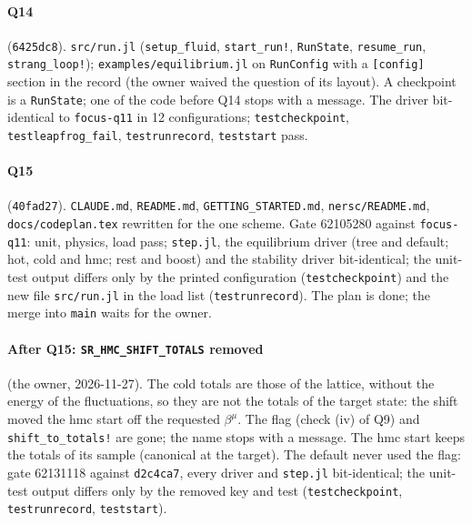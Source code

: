 \documentclass[11pt,aps,preprint,nofootinbib,superscriptaddress,tightenlines]{revtex4-2}
\let\oldparagraph\paragraph
\renewcommand{\paragraph}{\par\bigskip\oldparagraph}
\begin{document}
\paragraph{Q14} (\texttt{6425dc8}).  \nolinkurl{src/run.jl} (\texttt{setup\_fluid}, \texttt{start\_run!}, \texttt{RunState},
\texttt{resume\_run}, \texttt{strang\_loop!}); \nolinkurl{examples/equilibrium.jl} on \texttt{RunConfig} with a \texttt{[config]}
section in the record (the owner waived the question of its layout).  A checkpoint is a \texttt{RunState}; one of the code before Q14
stops with a message.  The driver bit-identical to \texttt{focus-q11} in 12 configurations; \texttt{testcheckpoint},
\texttt{testleapfrog\_fail}, \texttt{testrunrecord}, \texttt{teststart} pass.

\paragraph{Q15} (\texttt{40fad27}).  \nolinkurl{CLAUDE.md}, \nolinkurl{README.md}, \nolinkurl{GETTING_STARTED.md},
\nolinkurl{nersc/README.md}, \nolinkurl{docs/codeplan.tex} rewritten for the one scheme.  Gate 62105280 against \texttt{focus-q11}:
unit, physics, load pass; \texttt{step.jl}, the equilibrium driver (tree and default; hot, cold and hmc; rest and boost) and the
stability driver bit-identical; the unit-test output differs only by the printed configuration (\texttt{testcheckpoint}) and the
new file \nolinkurl{src/run.jl} in the load list (\texttt{testrunrecord}).  The plan is done; the merge into \texttt{main} waits for
the owner.

\paragraph{After Q15: \texttt{SR\_HMC\_SHIFT\_TOTALS} removed} (the owner, 2026-11-27).  The cold totals are those of the lattice, without
the energy of the fluctuations, so they are not the totals of the target state: the shift moved the hmc start off the requested
$\beta^\mu$.  The flag (check (iv) of Q9) and \texttt{shift\_to\_totals!} are gone; the name stops with a message.  The hmc start keeps
the totals of its sample (canonical at the target).  The default never used the flag: gate 62131118 against \texttt{d2c4ca7}, every driver and \texttt{step.jl} bit-identical; the
unit-test output differs only by the removed key and test (\texttt{testcheckpoint}, \texttt{testrunrecord}, \texttt{teststart}).
\end{document}

